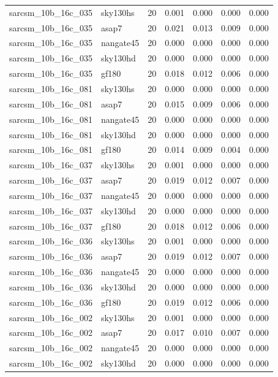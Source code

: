 \begin{tabular}{llrrrrr}
sarcsm\_10b\_16c\_035 & sky130hs & 20 & 0.001 & 0.000 & 0.000 & 0.000 \\
sarcsm\_10b\_16c\_035 & asap7 & 20 & 0.021 & 0.013 & 0.009 & 0.000 \\
sarcsm\_10b\_16c\_035 & nangate45 & 20 & 0.000 & 0.000 & 0.000 & 0.000 \\
sarcsm\_10b\_16c\_035 & sky130hd & 20 & 0.000 & 0.000 & 0.000 & 0.000 \\
sarcsm\_10b\_16c\_035 & gf180 & 20 & 0.018 & 0.012 & 0.006 & 0.000 \\
sarcsm\_10b\_16c\_081 & sky130hs & 20 & 0.000 & 0.000 & 0.000 & 0.000 \\
sarcsm\_10b\_16c\_081 & asap7 & 20 & 0.015 & 0.009 & 0.006 & 0.000 \\
sarcsm\_10b\_16c\_081 & nangate45 & 20 & 0.000 & 0.000 & 0.000 & 0.000 \\
sarcsm\_10b\_16c\_081 & sky130hd & 20 & 0.000 & 0.000 & 0.000 & 0.000 \\
sarcsm\_10b\_16c\_081 & gf180 & 20 & 0.014 & 0.009 & 0.004 & 0.000 \\
sarcsm\_10b\_16c\_037 & sky130hs & 20 & 0.001 & 0.000 & 0.000 & 0.000 \\
sarcsm\_10b\_16c\_037 & asap7 & 20 & 0.019 & 0.012 & 0.007 & 0.000 \\
sarcsm\_10b\_16c\_037 & nangate45 & 20 & 0.000 & 0.000 & 0.000 & 0.000 \\
sarcsm\_10b\_16c\_037 & sky130hd & 20 & 0.000 & 0.000 & 0.000 & 0.000 \\
sarcsm\_10b\_16c\_037 & gf180 & 20 & 0.018 & 0.012 & 0.006 & 0.000 \\
sarcsm\_10b\_16c\_036 & sky130hs & 20 & 0.001 & 0.000 & 0.000 & 0.000 \\
sarcsm\_10b\_16c\_036 & asap7 & 20 & 0.019 & 0.012 & 0.007 & 0.000 \\
sarcsm\_10b\_16c\_036 & nangate45 & 20 & 0.000 & 0.000 & 0.000 & 0.000 \\
sarcsm\_10b\_16c\_036 & sky130hd & 20 & 0.000 & 0.000 & 0.000 & 0.000 \\
sarcsm\_10b\_16c\_036 & gf180 & 20 & 0.019 & 0.012 & 0.006 & 0.000 \\
sarcsm\_10b\_16c\_002 & sky130hs & 20 & 0.001 & 0.000 & 0.000 & 0.000 \\
sarcsm\_10b\_16c\_002 & asap7 & 20 & 0.017 & 0.010 & 0.007 & 0.000 \\
sarcsm\_10b\_16c\_002 & nangate45 & 20 & 0.000 & 0.000 & 0.000 & 0.000 \\
sarcsm\_10b\_16c\_002 & sky130hd & 20 & 0.000 & 0.000 & 0.000 & 0.000 \\

\end{tabular}
